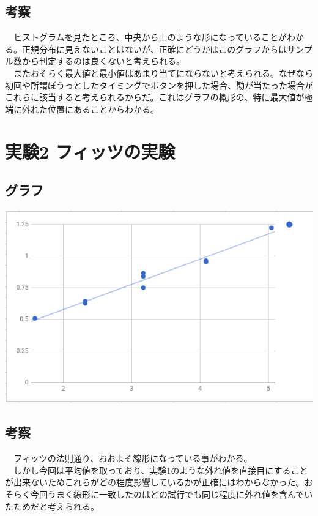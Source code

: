 \documentclass{scrartcl}
\begin{document}
\subsection{考察}
\label{sec:org8890805}
　ヒストグラムを見たところ、中央から山のような形になっていることがわかる。正規分布に見えないことはないが、正確にどうかはこのグラフからはサンプル数から判定するのは良くないと考えられる。\\
　またおそらく最大値と最小値はあまり当てにならないと考えられる。なぜなら初回や所謂ぼうっとしたタイミングでボタンを押した場合、勘が当たった場合がこれらに該当すると考えられるからだ。これはグラフの概形の、特に最大値が極端に外れた位置にあることからわかる。\\
\section{実験2 フィッツの実験}
\label{sec:orgaea390e}
\subsection{グラフ}
\label{sec:orgdd0cfdf}
\begin{center}
\includegraphics[width=0.8\linewidth]{./2-1.png}
\end{center}
\subsection{考察}
\label{sec:org405b5ac}
　フィッツの法則通り、おおよそ線形になっている事がわかる。\\
　しかし今回は平均値を取っており、実験1のような外れ値を直接目にすることが出来ないためこれらがどの程度影響しているかが正確にはわからなかった。おそらく今回うまく線形に一致したのはどの試行でも同じ程度に外れ値を含んでいたためだと考えられる。\\
\end{document}

